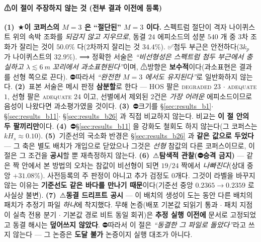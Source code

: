 \documentclass[11pt]{report}
\numberwithin{equation}{chapter}
\numberwithin{figure}{chapter}
\numberwithin{table}{chapter}
\begin{document}
\paragraph{⚠이 절이 주장하지 않는 것 (전부 결과 이전에 등록)}
\textbf{(1)}~★\textbf{이 코퍼스의 $M{=}3$ 은 ``절단된'' $M{=}3$ 이다.} 스펙트럼 절단이
격자 나이퀴스트 위의 속박 조화를 \emph{되감지 않고 지우므로}, 동결 $24$ 에피소드의 성분
$540$ 개 중 $3$차 조화가 잘리는 것이 $\mathbf{50.0\%}$ 다($2$차까지 잘리는 것 $34.4\%$).
✅첨두 부근은 안전하다($3 k_p$ 가 나이퀴스트의 $32.9\%$). ⟹ 정확한 서술은 \emph{``비선형성은
스펙트럼 첨두 부근에서 충실하고 $\lambda \lesssim 6$\,m 꼬리에서 과소표현된다''}이며,
⚠방향은 \textbf{보수적}이다(과소표현은 결과를 선형 쪽으로 끈다). ⛔따라서 \emph{``완전한
$M{=}3$ 에서도 유지된다''}로 일반화하지 않는다.
\textbf{(2)}~표본 서술은 메시 판정 \textbf{삼분할}로 한다 --- HOS 팔은 \textsc{degraded}
$23$ $\cdot$ \textsc{adequate} $1$, 선형 팔은 \textsc{adequate} $24$ 이고, 선별에서 제외된
$2$건은 \emph{가장 어려운} 에피소드이므로 음성이 나왔다면 과소평가였을 것이다.
\textbf{(3)}~⛔크기를 \S\ref{sec:results_b1}$\cdot$\S\ref{sec:results_b11}$\cdot$
\S\ref{sec:results_b26} 과 직접 비교하지 않는다. 비교는 \textbf{이 절 안의 두 팔끼리만}이다.
\textbf{(4)}~⛔\S\ref{sec:results_b11} 을 강화도 철회도 하지 않는다(그 코퍼스는 $k H_s \approx 0.10$).
\textbf{(5)}~기준선의 국소화 반경은 \S\ref{sec:results_b26} 과 \textbf{같은 값으로 두었다}
--- 그 축은 별도 배치가 개입으로 닫았으나 그것은 \emph{선형} 참값의 다른 코퍼스이므로,
이 절은 그 조건을 \textbf{공시}할 뿐 재측정하지 않는다.
\textbf{(6)}~⚠\textbf{탐색적 관찰(⛔승격 금지)} --- 같은 짝 안에서 본 방법의 오차는 참값이
비선형이 되면 $19/24$ 짝에서 \emph{나빠진다}(상대 중앙 $+31.08\%$). 사전등록의 주 판정이
아니고 추가 검정도 $0$개다. 그것이 라벨을 바꾸지 않는 이유는 \textbf{기준선도 같은 바다를
만나기 때문}이다(기준선 중앙 $0.2365 \to 0.2359$ 로 사실상 불변).
\textbf{(7)}~⚠\textbf{동결 드리프트 공시} --- 이 배치의 생성이 도는 동안 다른 배치의 패치가
추정기 파일 \emph{하나}에 착지했다. 무해 논증(배포 기본값 되읽기 통과 $\cdot$ 패치 지점이
실측 전용 분기 $\cdot$ 기본값 경로 비트 동일 회귀)은 \textbf{추정 실행 이전에} 문서로
고정되었고 동결 해시는 \textbf{덮어쓰지 않았다}. ⛔따라서 이 절은 \emph{``동결한 그 파일로
돌았다''}라고 쓰지 않는다 --- 그 논증은 \textbf{도달 불가} 논증이지 실행 대조가 아니다.

\end{document}
